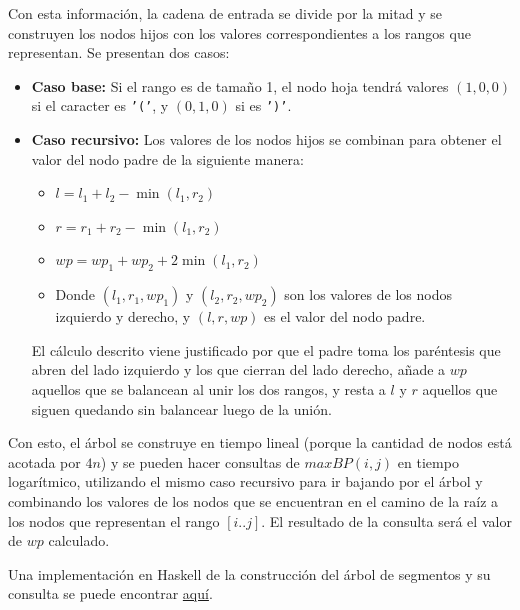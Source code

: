 \documentclass[letterpaper, 12pt]{article}
\begin{document}
\begin{enumerate}
Con esta información, la cadena de entrada se divide por la mitad y se construyen los nodos hijos con los valores correspondientes a los rangos que representan. Se presentan dos casos:

\begin{itemize}
    \item \textbf{Caso base:} Si el rango es de tamaño 1, el nodo hoja tendrá valores $(1, 0, 0)$ si el caracter es \texttt{'('}, y $(0, 1, 0)$ si es \texttt{')'}.
    \item \textbf{Caso recursivo:} Los valores de los nodos hijos se combinan para obtener el valor del nodo padre de la siguiente manera:
    \begin{itemize}
        \item $l = l_1 + l_2 - \min(l_1, r_2)$
        \item $r = r_1 + r_2 - \min(l_1, r_2)$
        \item $wp = wp_1 + wp_2 + 2\min(l_1, r_2)$
        \item Donde $(l_1, r_1, wp_1)$ y $(l_2, r_2, wp_2)$ son los valores de los nodos izquierdo y derecho, y $(l, r, wp)$ es el valor del nodo padre.
    \end{itemize}

    El cálculo descrito viene justificado por que el padre toma los paréntesis que abren del lado izquierdo y los que cierran del lado derecho, añade a $wp$ aquellos que se balancean al unir los dos rangos, y resta a $l$ y $r$ aquellos que siguen quedando sin balancear luego de la unión.
\end{itemize}

Con esto, el árbol se construye en tiempo lineal (porque la cantidad de nodos está acotada por $4n$) y se pueden hacer consultas de $maxBP(i, j)$ en tiempo logarítmico, utilizando el mismo caso recursivo para ir bajando por el árbol y combinando los valores de los nodos que se encuentran en el camino de la raíz a los nodos que representan el rango $[i..j]$. El resultado de la consulta será el valor de $wp$ calculado.

Una implementación en Haskell de la construcción del árbol de segmentos y su consulta se puede encontrar \href{}{aquí}.

\end{enumerate} \vspace{4mm}
\end{document}
